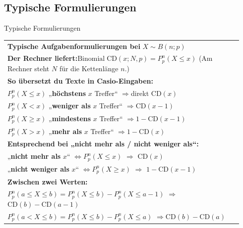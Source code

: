 \subsection{Typische Formulierungen}
\begin{bem}{Typische Formulierungen}{}
    \begin{center}
    
\begin{tabular}{p{0.94\linewidth}}
\hline
\textbf{Typische Aufgabenformulierungen bei }$X\sim B(n;p)$\\[6pt]

\textbf{Der Rechner liefert:}\qquad \(\mathrm{Binomial\;CD}(x;N,p)=P^n_p(X\le x)\) \quad (Am Rechner steht \(N\) für die Kettenlänge \(n\).)\\[6pt]

\textbf{So übersetzt du Texte in Casio-Eingaben:}\\[4pt]
\(\boxed{P^n_p(X\le x)}\) \quad „\textbf{höchstens} \(x\) Treffer“ \quad\(\Rightarrow\)\quad direkt \(\mathrm{CD}(x)\)\\[4pt]

\(\boxed{P^n_p(X< x)}\) \quad „\textbf{weniger als} \(x\) Treffer“ \quad\(\Rightarrow\)\quad \(\mathrm{CD}(x-1)\)\\[4pt]

\(\boxed{P^n_p(X\ge x)}\) \quad „\textbf{mindestens} \(x\) Treffer“ \quad\(\Rightarrow\)\quad \(1-\mathrm{CD}(x-1)\)\\[4pt]

\(\boxed{P^n_p(X> x)}\) \quad „\textbf{mehr als} \(x\) Treffer“ \quad\(\Rightarrow\)\quad \(1-\mathrm{CD}(x)\)\\[6pt]

\textbf{Entsprechend bei „nicht mehr als / nicht weniger als“:}\\[4pt]
„\textbf{nicht mehr als} \(x\)“ \(\Leftrightarrow P^n_p(X\le x)\) \(\Rightarrow\) \(\mathrm{CD}(x)\)\\[4pt]
„\textbf{nicht weniger als} \(x\)“ \(\Leftrightarrow P^n_p(X\ge x)\) \(\Rightarrow\) \(1-\mathrm{CD}(x-1)\)\\[6pt]

\textbf{Zwischen zwei Werten:}\\[4pt]
\(\boxed{P^n_p(a\le X\le b) = P^n_p(X\leq b) - P^n_p(X\leq a-1)} \) \quad\(\Rightarrow\)\quad \(\mathrm{CD}(b)-\mathrm{CD}(a-1)\)\\[4pt]
\(\boxed{P^n_p(a< X\le b)= P^n_p(X\leq b) - P^n_p(X\leq a)}\) \quad\(\Rightarrow\)\quad \(\mathrm{CD}(b)-\mathrm{CD}(a)\)\\
\hline
\end{tabular}
\end{center}

\end{bem}

